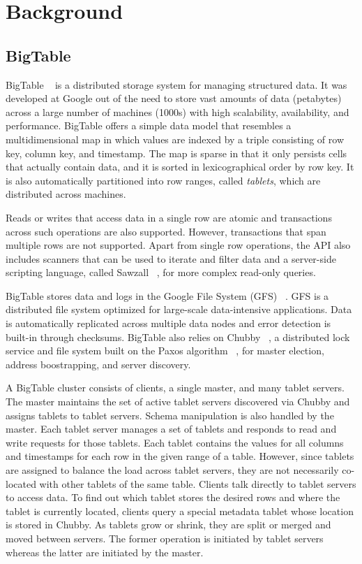 \documentclass[10pt,final,journal]{IEEEtran}
\begin{document}


\section{Background}

\subsection{BigTable}
BigTable ~\cite{Chang:2006:BDS:1267308.1267323} is a distributed storage system for managing structured data. It was developed at Google out of the need to store vast amounts of data (petabytes) across a large number of machines (1000s) with high scalability, availability, and performance. BigTable offers a simple data model that resembles a multidimensional map in which values are indexed by a triple consisting of row key, column key, and timestamp. The map is sparse in that it only persists cells that actually contain data, and it is sorted in lexicographical order by row key. It is also automatically partitioned into row ranges, called \emph{tablets}, which are distributed across machines.

Reads or writes that access data in a single row are atomic and transactions across such operations are also supported. However, transactions that span multiple rows are not supported. Apart from single row operations, the API also includes scanners that can be used to iterate and filter data and a server-side scripting language, called Sawzall ~\cite{Pike:2005}, for more complex read-only queries.

BigTable stores data and logs in the Google File System (GFS) ~\cite{Ghemawat:2003:GFS:1165389.945450}. GFS is a distributed file system optimized for large-scale data-intensive applications. Data is automatically replicated across multiple data nodes and error detection is built-in through checksums. BigTable also relies on Chubby ~\cite{Burrows:2006}, a distributed lock service and file system built on the Paxos algorithm ~\cite{Lamport:1998:PP:279227.279229, Lamport:2001:PMS}, for master election, address boostrapping, and server discovery.

A BigTable cluster consists of clients, a single master, and many tablet servers. The master maintains the set of active tablet servers discovered via Chubby and assigns tablets to tablet servers. Schema manipulation is also handled by the master. Each tablet server manages a set of tablets and responds to read and write requests for those tablets. Each tablet contains the values for all columns and timestamps for each row in the given range of a table. However, since tablets are assigned to balance the load across tablet servers, they are not necessarily co-located with other tablets of the same table. Clients talk directly to tablet servers to access data. To find out which tablet stores the desired rows and where the tablet is currently located, clients query a special metadata tablet whose location is stored in Chubby. As tablets grow or shrink, they are split or merged and moved between servers. The former operation is initiated by tablet servers whereas the latter are initiated by the master.
\end{document}
